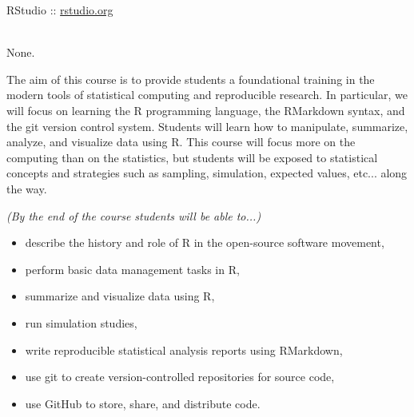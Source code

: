 \documentclass[10pt]{article}
\begin{document}
RStudio :: \href{http://www.rstudio.org}{rstudio.org}


\bigskip
{}\\
None.




\bigskip
{}

The aim of this course is to provide students a foundational training in the modern tools of statistical computing and reproducible research. In particular, we will focus on learning the R programming language, the RMarkdown syntax, and the git version control system. Students will learn how to manipulate, summarize, analyze, and visualize data using R. This course will focus more on the computing than on the statistics, but students will be exposed to statistical concepts and strategies such as sampling, simulation, expected values, etc... along the way. 
 


\bigskip
{} {\em (By the end of the course students will be able to...)}

\begin{itemize}
\item describe the history and role of R in the open-source software movement,
\item perform basic data management tasks in R, 
\item summarize and visualize data using R,
\item run simulation studies, 
\item write reproducible statistical analysis reports using RMarkdown,
\item use git to create version-controlled repositories for source code,
\item use GitHub to store, share, and distribute code.
\end{itemize}
    
\end{document}
